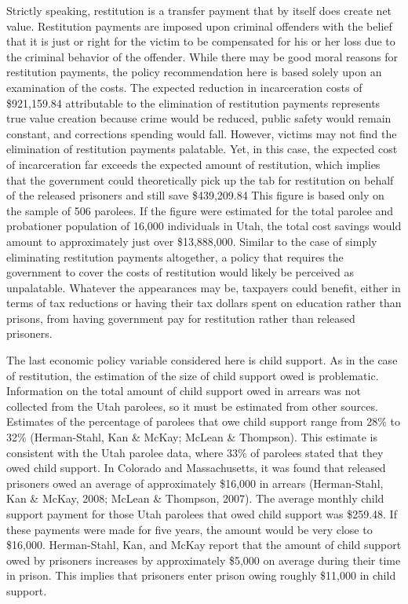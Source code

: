Strictly speaking, restitution is a transfer payment that by itself does create net value.  Restitution payments are imposed upon criminal offenders with the belief that it is just or right for the victim to be compensated for his or her loss due to the criminal behavior of the offender.  While there may be good moral reasons for restitution payments, the policy recommendation here is based solely upon an examination of the costs.  The expected reduction in incarceration costs of \$921,159.84 attributable to the elimination of restitution payments represents true value creation because crime would be reduced, public safety would remain constant, and corrections spending would fall.  However, victims may not find the elimination of restitution payments palatable.  Yet, in this case, the expected cost of incarceration far exceeds the expected amount of restitution, which implies that the government could theoretically pick up the tab for restitution on behalf of the released prisoners and still save \$439,209.84  This figure is based only on the sample of 506 parolees.  If the figure were estimated for the total parolee and probationer population of 16,000 individuals in Utah, the total cost savings would amount to approximately just over \$13,888,000.  Similar to the case of simply eliminating restitution payments altogether, a policy that requires the government to cover the costs of restitution would likely be perceived as unpalatable.  Whatever the appearances may be, taxpayers could benefit, either in terms of tax reductions or having their tax dollars spent on education rather than prisons, from having government pay for restitution rather than released prisoners.

The last economic policy variable considered here is child support.  As in the case of restitution, the estimation of the size of child support owed is problematic.  Information on the total amount of child support owed in arrears was not collected from the Utah parolees, so it must be estimated from other sources.  Estimates of the percentage of parolees that owe child support range from 28\% to 32\% (Herman-Stahl, Kan \& McKay; McLean \& Thompson).  This estimate is consistent with the Utah parolee data, where 33\% of parolees stated that they owed child support.  In Colorado and Massachusetts, it was found that released prisoners owed an average of approximately \$16,000 in arrears (Herman-Stahl, Kan \& McKay, 2008; McLean \& Thompson, 2007).  The average monthly child support payment for those Utah parolees that owed child support was \$259.48.  If these payments were made for five years, the amount would be very close to \$16,000.  Herman-Stahl, Kan, and McKay report that the amount of child support owed by prisoners increases by approximately \$5,000 on average during their time in prison.  This implies that prisoners enter prison owing roughly \$11,000 in child support.

